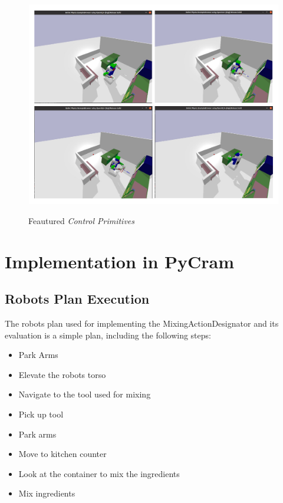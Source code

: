 \begin{figure}[H]
    \includegraphics[scale=0.3]{Graphics/control_primitives.jpg}
    \label{fig:controlprimitives}
    \caption{Feautured \textit{Control Primitives}}
\end{figure}

\section{Implementation in PyCram}

\subsection{Robots Plan Execution}
The robots plan used for implementing the MixingActionDesignator and its evaluation is 
a simple plan, including the following steps:

\begin{itemize}
    \item Park Arms
    \item Elevate the robots torso
    \item Navigate to the tool used for mixing
    \item Pick up tool
    \item Park arms
    \item Move to kitchen counter
    \item Look at the container to mix the ingredients
    \item Mix ingredients
\end{itemize}

